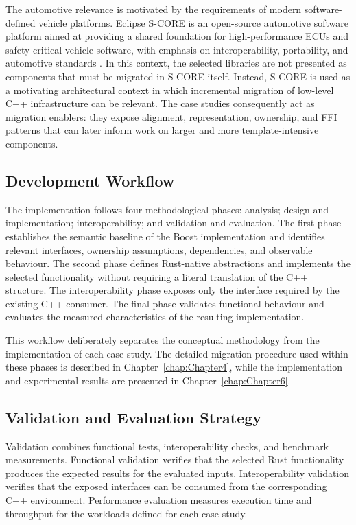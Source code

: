 The automotive relevance is motivated by the requirements of modern software-defined
vehicle platforms. Eclipse S-CORE is an open-source automotive software platform aimed at
providing a shared foundation for high-performance ECUs and safety-critical vehicle
software, with emphasis on interoperability, portability, and automotive standards
\parencite{eclipse_score}. In this context, the selected libraries are not presented as
components that must be migrated in S-CORE itself. Instead, S-CORE is used as a motivating
architectural context in which incremental migration of low-level C++ infrastructure can
be relevant. The case studies consequently act as migration enablers: they expose
alignment, representation, ownership, and FFI patterns that can later inform work on
larger and more template-intensive components.

\subsection{Development Workflow}

The implementation follows four methodological phases: analysis; design and
implementation; interoperability; and validation and evaluation. The first phase
establishes the semantic baseline of the Boost implementation and identifies relevant
interfaces, ownership assumptions, dependencies, and observable behaviour. The second
phase defines Rust-native abstractions and implements the selected functionality without
requiring a literal translation of the C++ structure. The interoperability phase exposes
only the interface required by the existing C++ consumer. The final phase validates
functional behaviour and evaluates the measured characteristics of the resulting
implementation.

This workflow deliberately separates the conceptual methodology from the implementation
of each case study. The detailed migration procedure used within these phases is described
in Chapter~\ref{chap:Chapter4}, while the implementation and experimental results are
presented in Chapter~\ref{chap:Chapter6}.

\subsection{Validation and Evaluation Strategy}

Validation combines functional tests, interoperability checks, and benchmark measurements.
Functional validation verifies that the selected Rust functionality produces the expected
results for the evaluated inputs. Interoperability validation verifies that the exposed
interfaces can be consumed from the corresponding C++ environment. Performance evaluation
measures execution time and throughput for the workloads defined for each case study.

